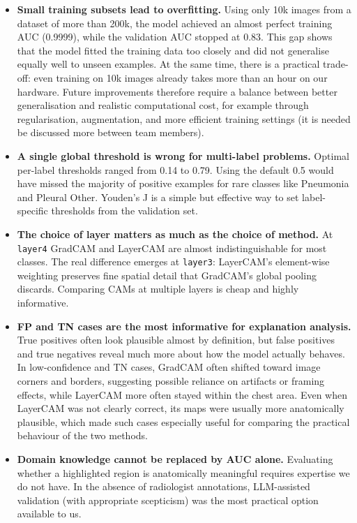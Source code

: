 \documentclass[12pt]{article}
\begin{document}
\begin{itemize}
    \item \textbf{Small training subsets lead to overfitting.}
    Using only 10k images from a dataset of more than 200k, the model achieved an almost perfect training AUC (0.9999), while the validation AUC stopped at 0.83. This gap shows that the model fitted the training data too closely and did not generalise equally well to unseen examples. At the same time, there is a practical trade-off: even training on 10k images already takes more than an hour on our hardware. Future improvements therefore require a balance between better generalisation and realistic computational cost, for example through regularisation, augmentation, and more efficient training settings (it is needed be discussed more between team members).

    \item \textbf{A single global threshold is wrong for multi-label problems.}
    Optimal per-label thresholds ranged from 0.14 to 0.79.
    Using the default 0.5 would have missed the majority of positive examples for rare classes like Pneumonia and Pleural Other.
    Youden's J is a simple but effective way to set label-specific thresholds from the validation set.

    \item \textbf{The choice of layer matters as much as the choice of method.}
    At \texttt{layer4} GradCAM and LayerCAM are almost indistinguishable for most classes.
    The real difference emerges at \texttt{layer3}: LayerCAM's element-wise weighting preserves fine spatial detail that GradCAM's global pooling discards.
    Comparing CAMs at multiple layers is cheap and highly informative.

    \item \textbf{FP and TN cases are the most informative for explanation analysis.}
    True positives often look plausible almost by definition, but false positives and true negatives reveal much more about how the model actually behaves. In low-confidence and TN cases, GradCAM often shifted toward image corners and borders, suggesting possible reliance on artifacts or framing effects, while LayerCAM more often stayed within the chest area. Even when LayerCAM was not clearly correct, its maps were usually more anatomically plausible, which made such cases especially useful for comparing the practical behaviour of the two methods.

    \item \textbf{Domain knowledge cannot be replaced by AUC alone.}
    Evaluating whether a highlighted region is anatomically meaningful requires expertise we do not have.
    In the absence of radiologist annotations, LLM-assisted validation (with appropriate scepticism) was the most practical option available to us.
\end{itemize}
\end{document}
